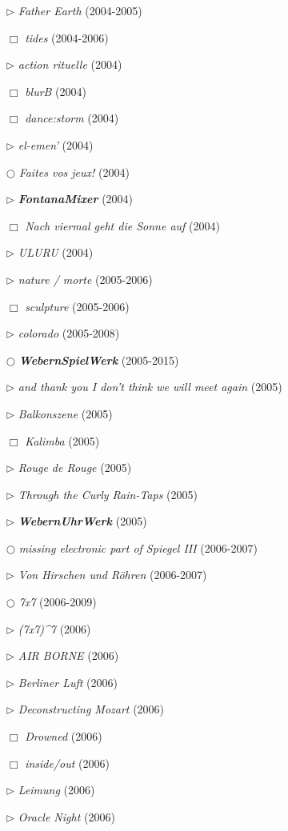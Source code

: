 \documentclass[a4paper,12pt]{article}
\begin{document}
\begin{itemize}
\item[$\rhd$] \emph{Father Earth} (2004-2005)
\item[$\Box$] \emph{tides} (2004-2006)
\item[$\rhd$] \emph{action rituelle} (2004)
\item[$\Box$] \emph{blurB} (2004)
\item[$\Box$] \emph{dance:storm} (2004)
\item[$\rhd$] \emph{el-emen'} (2004)
\item[$\bigcirc$] \emph{Faites vos jeux!} (2004)
\item[$\rhd$] \textbf{\emph{FontanaMixer}} (2004)
\item[$\Box$] \emph{Nach viermal geht die Sonne auf} (2004)
\item[$\rhd$] \emph{ULURU} (2004)
\item[$\rhd$] \emph{nature / morte} (2005-2006)
\item[$\Box$] \emph{sculpture} (2005-2006)
\item[$\rhd$] \emph{colorado} (2005-2008)
\item[$\bigcirc$] \textbf{\emph{WebernSpielWerk}} (2005-2015)
\item[$\rhd$] \emph{and thank you I don't think we will meet again} (2005)
\item[$\rhd$] \emph{Balkonszene} (2005)
\item[$\Box$] \emph{Kalimba} (2005)
\item[$\rhd$] \emph{Rouge de Rouge} (2005)
\item[$\rhd$] \emph{Through the Curly Rain-Taps} (2005)
\item[$\rhd$] \textbf{\emph{WebernUhrWerk}} (2005)
\item[$\bigcirc$] \emph{missing electronic part of Spiegel III} (2006-2007)
\item[$\rhd$] \emph{Von Hirschen und Röhren} (2006-2007)
\item[$\bigcirc$] \emph{7x7} (2006-2009)
\item[$\rhd$] \emph{(7x7)\^{}7} (2006)
\item[$\rhd$] \emph{AIR BORNE} (2006)
\item[$\rhd$] \emph{Berliner Luft} (2006)
\item[$\rhd$] \emph{Deconstructing Mozart} (2006)
\item[$\Box$] \emph{Drowned} (2006)
\item[$\Box$] \emph{inside/out} (2006)
\item[$\rhd$] \emph{Leimung} (2006)
\item[$\rhd$] \emph{Oracle Night} (2006)

\end{itemize}
\end{document}

